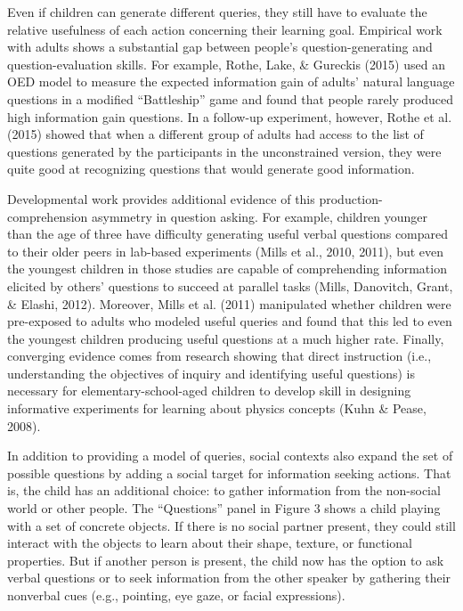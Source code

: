 \documentclass[oneside]{report}
\begin{document}
Even if children can generate different queries, they still have to
evaluate the relative usefulness of each action concerning their
learning goal. Empirical work with adults shows a substantial gap
between people's question-generating and question-evaluation skills. For
example, Rothe, Lake, \& Gureckis (2015) used an OED model to measure
the expected information gain of adults' natural language questions in a
modified ``Battleship'' game and found that people rarely produced high
information gain questions. In a follow-up experiment, however, Rothe et
al. (2015) showed that when a different group of adults had access to
the list of questions generated by the participants in the unconstrained
version, they were quite good at recognizing questions that would
generate good information.

Developmental work provides additional evidence of this
production-comprehension asymmetry in question asking. For example,
children younger than the age of three have difficulty generating useful
verbal questions compared to their older peers in lab-based experiments
(Mills et al., 2010, 2011), but even the youngest children in those
studies are capable of comprehending information elicited by others'
questions to succeed at parallel tasks (Mills, Danovitch, Grant, \&
Elashi, 2012). Moreover, Mills et al. (2011) manipulated whether
children were pre-exposed to adults who modeled useful queries and found
that this led to even the youngest children producing useful questions
at a much higher rate. Finally, converging evidence comes from research
showing that direct instruction (i.e., understanding the objectives of
inquiry and identifying useful questions) is necessary for
elementary-school-aged children to develop skill in designing
informative experiments for learning about physics concepts (Kuhn \&
Pease, 2008).

In addition to providing a model of queries, social contexts also expand
the set of possible questions by adding a social target for information
seeking actions. That is, the child has an additional choice: to gather
information from the non-social world or other people. The ``Questions''
panel in Figure 3 shows a child playing with a set of concrete objects.
If there is no social partner present, they could still interact with
the objects to learn about their shape, texture, or functional
properties. But if another person is present, the child now has the
option to ask verbal questions or to seek information from the other
speaker by gathering their nonverbal cues (e.g., pointing, eye gaze, or
facial expressions).
\end{document}
